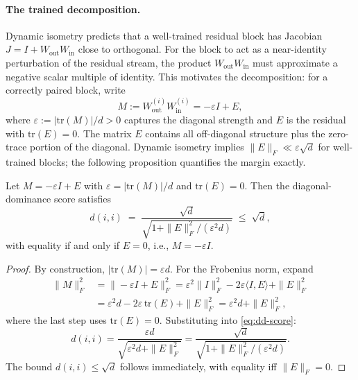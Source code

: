 \documentclass[wcp]{jmlr}
\begin{document}
\paragraph{The trained decomposition.} Dynamic isometry \citep{pennington2017isometry} predicts that a well-trained residual block has Jacobian $J = I + W_{\mathrm{out}} W_{\mathrm{in}}$ close to orthogonal. For the block to act as a near-identity perturbation of the residual stream, the product $W_{\mathrm{out}} W_{\mathrm{in}}$ must approximate a negative scalar multiple of identity. This motivates the decomposition: for a correctly paired block, write
\begin{equation}\label{eq:decomp}
  M := W_{\mathrm{out}}^{(i)} W_{\mathrm{in}}^{(i)} = -\varepsilon I + E,
\end{equation}
where $\varepsilon := |\mathrm{tr}(M)|/d > 0$ captures the diagonal strength and $E$ is the residual with $\mathrm{tr}(E) = 0$. The matrix $E$ contains all off-diagonal structure plus the zero-trace portion of the diagonal. Dynamic isometry implies $\|E\|_F \ll \varepsilon\sqrt{d}$ for well-trained blocks; the following proposition quantifies the margin exactly.

\begin{proposition}\label{prop:margin}
Let $M = -\varepsilon I + E$ with $\varepsilon = |\mathrm{tr}(M)|/d$ and $\mathrm{tr}(E) = 0$. Then the diagonal-dominance score satisfies
\begin{equation}\label{eq:margin-formula}
  d(i,i) \;=\; \frac{\sqrt{d}}{\sqrt{1 + \|E\|_F^2 / (\varepsilon^2 d)}} \;\leq\; \sqrt{d},
\end{equation}
with equality if and only if $E = 0$, i.e., $M = -\varepsilon I$.
\end{proposition}

\begin{proof}
By construction, $|\mathrm{tr}(M)| = \varepsilon d$. For the Frobenius norm, expand
\begin{align*}
  \|M\|_F^2 &= \|-\varepsilon I + E\|_F^2 = \varepsilon^2 \|I\|_F^2 - 2\varepsilon \langle I, E \rangle + \|E\|_F^2 \\
            &= \varepsilon^2 d - 2\varepsilon \,\mathrm{tr}(E) + \|E\|_F^2 = \varepsilon^2 d + \|E\|_F^2,
\end{align*}
where the last step uses $\mathrm{tr}(E) = 0$. Substituting into \eqref{eq:dd-score}:
\[
  d(i,i) = \frac{\varepsilon d}{\sqrt{\varepsilon^2 d + \|E\|_F^2}} = \frac{\sqrt{d}}{\sqrt{1 + \|E\|_F^2/(\varepsilon^2 d)}}.
\]
The bound $d(i,i) \leq \sqrt{d}$ follows immediately, with equality iff $\|E\|_F = 0$.
\end{proof}
\end{document}
